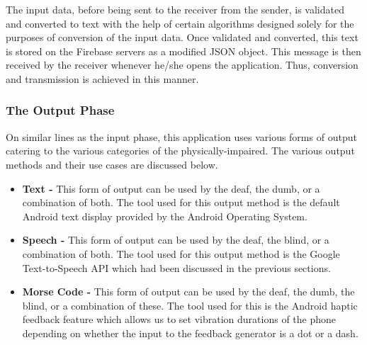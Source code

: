 \documentclass[14pt]{report}
\begin{document}
						The input data, before being sent to the receiver from the sender, is validated and converted to text with the help of certain algorithms designed solely for the purposes of conversion of the input data. Once validated and converted, this text is stored on the Firebase servers as a modified JSON object. This message is then received by the receiver whenever he/she opens the application. Thus, conversion and transmission is achieved in this manner.

				\subsubsection{The Output Phase}
					On similar lines as the input phase, this application uses various forms of output catering to the various categories of the physically-impaired. The various output methods and their use cases are discussed below.
					\begin{itemize}
						\item \textbf{Text - }This form of output can be used by the deaf,  the dumb,  or a combination of both. The tool used for this output method is the default Android text display provided by the Android Operating System.
						\item \textbf{Speech - }This form of output can be used by the deaf, the blind, or a combination of both. The tool used for this output method is the Google Text-to-Speech API which had been discussed in the previous sections.
						\item \textbf{Morse Code - }This form of output can be used by the deaf, the dumb, the blind, or a combination of these. The tool used for this is the Android haptic feedback feature which allows us to set vibration durations of the phone depending on whether the input to the feedback generator is a dot or a dash.
					\end{itemize}	
\end{document}
